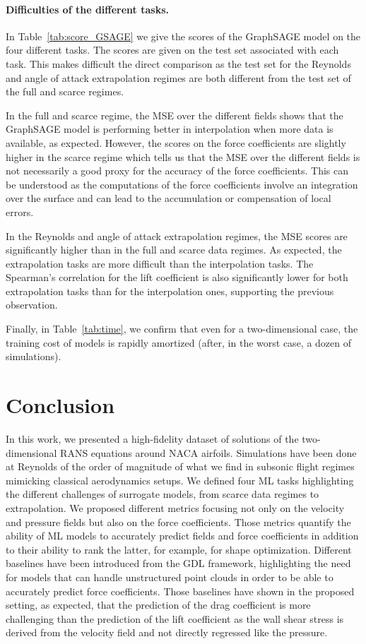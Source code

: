 \paragraph{Difficulties of the different tasks.} In Table~\ref{tab:score_GSAGE} we give the scores of the GraphSAGE model on the four different tasks. The scores are given on the test set associated with each task. This makes difficult the direct comparison as the test set for the Reynolds and angle of attack extrapolation regimes are both different from the test set of the full and scarce regimes.

In the full and scarce regime, the MSE over the different fields shows that the GraphSAGE model is performing better in interpolation when more data is available, as expected. However, the scores on the force coefficients are slightly higher in the scarce regime which tells us that the MSE over the different fields is not necessarily a good proxy for the accuracy of the force coefficients. This can be understood as the computations of the force coefficients involve an integration over the surface and can lead to the accumulation or compensation of local errors.

In the Reynolds and angle of attack extrapolation regimes, the MSE scores are significantly higher than in the full and scarce data regimes. As expected, the extrapolation tasks are more difficult than the interpolation tasks. The Spearman's correlation for the lift coefficient is also significantly lower for both extrapolation tasks than for the interpolation ones, supporting the previous observation.

Finally, in Table~\ref{tab:time}, we confirm that even for a two-dimensional case, the training cost of models is rapidly amortized (after, in the worst case, a dozen of simulations).

\section{Conclusion}\label{sec:conclusion}
In this work, we presented a high-fidelity dataset of solutions of the two-dimensional RANS equations around NACA airfoils. Simulations have been done at Reynolds of the order of magnitude of what we find in subsonic flight regimes mimicking classical aerodynamics setups. We defined four ML tasks highlighting the different challenges of surrogate models, from scarce data regimes to extrapolation. We proposed different metrics focusing not only on the velocity and pressure fields but also on the force coefficients. Those metrics quantify the ability of ML models to accurately predict fields and force coefficients in addition to their ability to rank the latter, for example, for shape optimization. Different baselines have been introduced from the GDL framework, highlighting the need for models that can handle unstructured point clouds in order to be able to accurately predict force coefficients. Those baselines have shown in the proposed setting, as expected, that the prediction of the drag coefficient is more challenging than the prediction of the lift coefficient as the wall shear stress is derived from the velocity field and not directly regressed like the pressure.


